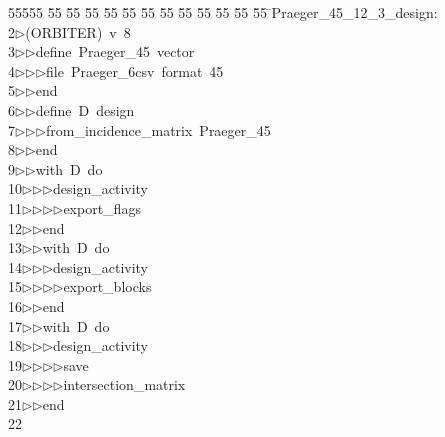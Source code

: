 %
%
\begin{tabbing}
55555 \= 55 \= 55 \= 55 \= 55 \= 55 \= 55 \= 55 \= 55 \= 55 \= 55 \= 55 \= 55 \= \>Praeger\_45\_12\_3\_design:\\[0pt]
2\>$\triangleright$\>(ORBITER)\ v\ 8\ \\[0pt]
3\>$\triangleright$\>$\triangleright$\>define\ Praeger\_45\ vector\ \\[0pt]
4\>$\triangleright$\>$\triangleright$\>$\triangleright$\>file\ Praeger\_6csv\ format\ 45\ \\[0pt]
5\>$\triangleright$\>$\triangleright$\>end\ \\[0pt]
6\>$\triangleright$\>$\triangleright$\>define\ D\ design\ \\[0pt]
7\>$\triangleright$\>$\triangleright$\>$\triangleright$\>from\_incidence\_matrix\ Praeger\_45\ \\[0pt]
8\>$\triangleright$\>$\triangleright$\>end\ \\[0pt]
9\>$\triangleright$\>$\triangleright$\>with\ D\ do\ \\[0pt]
10\>$\triangleright$\>$\triangleright$\>$\triangleright$\>design\_activity\ \\[0pt]
11\>$\triangleright$\>$\triangleright$\>$\triangleright$\>$\triangleright$\>export\_flags\ \\[0pt]
12\>$\triangleright$\>$\triangleright$\>end\ \\[0pt]
13\>$\triangleright$\>$\triangleright$\>with\ D\ do\ \\[0pt]
14\>$\triangleright$\>$\triangleright$\>$\triangleright$\>design\_activity\ \\[0pt]
15\>$\triangleright$\>$\triangleright$\>$\triangleright$\>$\triangleright$\>export\_blocks\ \\[0pt]
16\>$\triangleright$\>$\triangleright$\>end\ \\[0pt]
17\>$\triangleright$\>$\triangleright$\>with\ D\ do\ \\[0pt]
18\>$\triangleright$\>$\triangleright$\>$\triangleright$\>design\_activity\ \\[0pt]
19\>$\triangleright$\>$\triangleright$\>$\triangleright$\>$\triangleright$\>save\ \\[0pt]
20\>$\triangleright$\>$\triangleright$\>$\triangleright$\>$\triangleright$\>intersection\_matrix\ \\[0pt]
21\>$\triangleright$\>$\triangleright$\>end\\[0pt]
22\>\end{tabbing}
